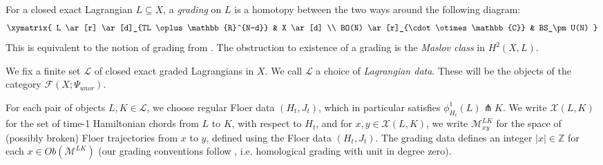\documentclass{TPmod}
\def\bC{\mathbb{C}}
\def\bR{\mathbb{R}}
\def\bZ{\mathbb{Z}}
\newcommand{\cF}{\mathcal{F}}
\newcommand{\cL}{\mathcal{L}}
\newcommand{\cM}{\mathcal{M}}
\newcommand{\cX}{\mathcal{X}}
\def\bZ{\mathbb{Z}}
\numberwithin{equation}{section}
\begin{document}
    For a closed exact Lagrangian $L \subseteq X$, a \emph{grading} on $L$ is a homotopy between the two ways around the following diagram:
    \begin{equation}
        \xymatrix{
            L
            \ar[r]
            \ar[d]_{TL \oplus \bR^{N-d}}
            &
            X
            \ar[d]
            \\
            BO(N)
            \ar[r]_{\cdot \otimes \bC} 
            &
            BS_\pm U(N)
        }
    \end{equation}
    This is equivalent to the notion of grading from \cite{Seidel:graded}. The obstruction to existence of a grading is the \emph{Maslov class} in $H^2(X,L)$.


    We fix a finite set $\cL$ of closed exact graded Lagrangians in $X$. We call $\cL$ a choice of \emph{Lagrangian data}. These will be the objects of the category $\cF(X;\Psi_{unor})$. 

    For each pair of objects $L, K \in \cL$, we choose regular Floer data $(H_t, J_t)$, which in particular satisfies $\phi_{H_t}^1(L) \pitchfork K$. We write $\cX(L,K)$ for the set of time-1 Hamiltonian chords from $L$ to $K$, with respect to $H_t$, and for $x,y \in \cX(L,K)$, we write $\cM^{LK}_{xy}$ for the space of (possibly broken) Floer trajectories from $x$ to $y$, defined using the Floer data $(H_t, J_t)$. The grading data defines an integer $|x| \in \bZ$ for each $x \in Ob(\cM^{LK})$ (our grading conventions follow \cite[Remark 1.4]{PS}, i.e. homological grading with unit in degree zero). 
\end{document}
